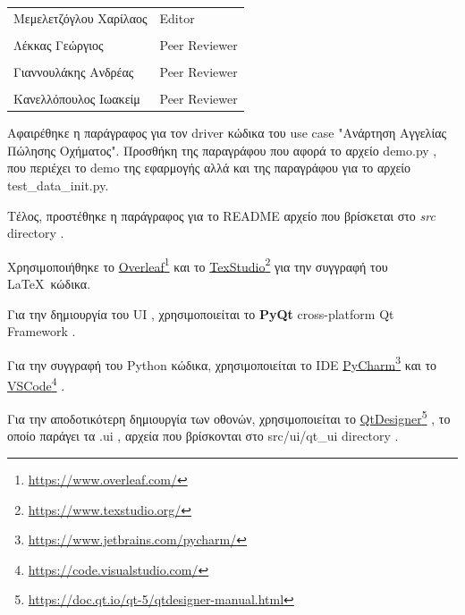 \documentclass{../ol-softwaremanual}
\newcommand{\doclink}[2]{\href{#1}{#2}\footnote{\url{#1}}}
\begin{document}
	
	\vspace{20pt}
	
	\begin{table}[htbp!]
		\begin{tabular}{ll}
			Μεμελετζόγλου Χαρίλαος & \en Editor \\
			\\ Λέκκας Γεώργιος      &   \en  Peer Reviewer \\
			\\ Γιαννουλάκης Ανδρέας & \en Peer Reviewer \\
			\\ Κανελλόπουλος Ιωακείμ & \en Peer Reviewer \\ 
		\end{tabular}
	\end{table}
	
	\vspace{10pt}
	\vspace{10pt}
	\flushleft
	
	Αφαιρέθηκε η παράγραφος για τον \en driver \gr κώδικα του \en use case "\gr Ανάρτηση Αγγελίας Πώλησης Οχήματος\en"\gr. Προσθήκη της παραγράφου που αφορά το αρχείο \en demo.py \gr, που περιέχει το \en demo \gr της εφαρμογής αλλά και της παραγράφου για το αρχείο \en test\_data\_init.py\gr. \break
	
	Τέλος, προστέθηκε η παράγραφος για το \en README \gr αρχείο που βρίσκεται στο \en \textit{src} directory \gr.

	
	
	
	\newpage
	
	
	\vspace{20pt}
	\flushleft
	Χρησιμοποιήθηκε το \en \doclink{https://www.overleaf.com/}{Overleaf} \gr και το \en \doclink{https://www.texstudio.org/}{TexStudio} \gr για την συγγραφή του \LaTeX\ κώδικα. \break
	
	Για την δημιουργία του \en UI \gr, χρησιμοποιείται το \en \textbf{PyQt} cross-platform Qt Framework \gr. \break
	
	Για την συγγραφή του \en Python \gr κώδικα, χρησιμοποιείται το \en IDE \doclink{https://www.jetbrains.com/pycharm/}{PyCharm} \gr και το \en \doclink{https://code.visualstudio.com/}{VSCode} \gr .  \break 
	
	Για την αποδοτικότερη δημιουργία των οθονών, χρησιμοποιείται το \en \doclink{https://doc.qt.io/qt-5/qtdesigner-manual.html}{QtDesigner} \gr, το οποίο παράγει τα \en .ui \gr, αρχεία που βρίσκονται στο \en src/ui/qt\_ui directory \gr . \break
	
\end{document}
